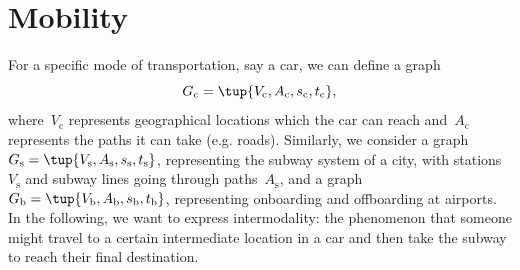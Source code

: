 %
%
%


\section{Mobility}

For a specific mode of transportation, say a car, we can define a graph
\begin{equation*}
    G_\mathrm{c}=\tup{V_\mathrm{c},A_\mathrm{c},s_\mathrm{c},t_\mathrm{c}},
\end{equation*}
where~$V_\mathrm{c}$ represents geographical locations which the car can reach and~$A_\mathrm{c}$ represents the paths it can take (e.g. roads). Similarly, we consider a graph~$G_\mathrm{s}=\tup{V_\mathrm{s},A_\mathrm{s},s_\mathrm{s},t_\mathrm{s}}$, representing the subway system of a city, with stations~$V_\mathrm{s}$ and subway lines going through paths~$A_\mathrm{s}$, and a graph $G_\mathrm{b}=\tup{V_\mathrm{b},A_\mathrm{b},s_\mathrm{b},t_\mathrm{b}}$, representing onboarding and offboarding at airports. In the following, we want to express intermodality: the phenomenon that someone might travel to a certain intermediate location in a car and then take the subway to reach their final destination.

